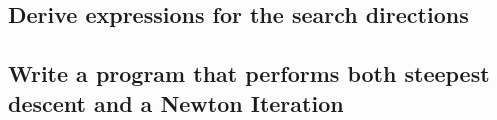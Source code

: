 \documentclass{article}
\begin{document}
\subsection{Derive expressions for the search directions}

\subsection{Write a program that performs both steepest descent and a
  Newton Iteration}





\end{document}
